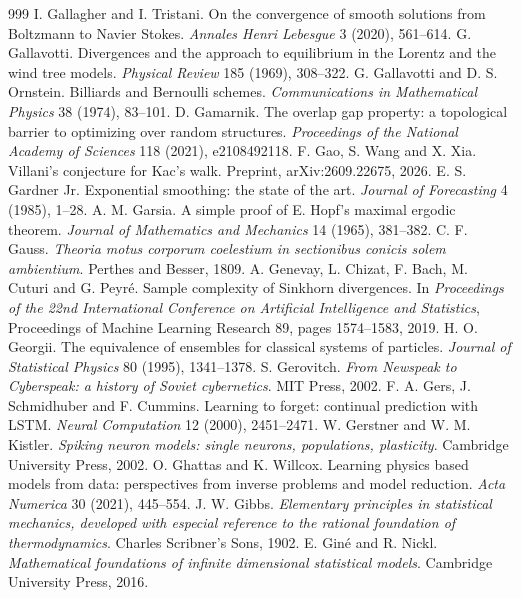 \begin{thebibliography}{999}
 I. Gallagher and I. Tristani. On the convergence of smooth solutions from Boltzmann to Navier Stokes. \emph{Annales Henri Lebesgue} 3 (2020), 561--614.
 G. Gallavotti. Divergences and the approach to equilibrium in the Lorentz and the wind tree models. \emph{Physical Review} 185 (1969), 308--322.
 G. Gallavotti and D. S. Ornstein. Billiards and Bernoulli schemes. \emph{Communications in Mathematical Physics} 38 (1974), 83--101.
 D. Gamarnik. The overlap gap property: a topological barrier to optimizing over random structures. \emph{Proceedings of the National Academy of Sciences} 118 (2021), e2108492118.
 F. Gao, S. Wang and X. Xia. Villani's conjecture for Kac's walk. Preprint, arXiv:2609.22675, 2026.
 E. S. Gardner Jr. Exponential smoothing: the state of the art. \emph{Journal of Forecasting} 4 (1985), 1--28.
 A. M. Garsia. A simple proof of E. Hopf's maximal ergodic theorem. \emph{Journal of Mathematics and Mechanics} 14 (1965), 381--382.
 C. F. Gauss. \emph{Theoria motus corporum coelestium in sectionibus conicis solem ambientium}. Perthes and Besser, 1809.
 A. Genevay, L. Chizat, F. Bach, M. Cuturi and G. Peyr\'e. Sample complexity of Sinkhorn divergences. In \emph{Proceedings of the 22nd International Conference on Artificial Intelligence and Statistics}, Proceedings of Machine Learning Research 89, pages 1574--1583, 2019.
 H. O. Georgii. The equivalence of ensembles for classical systems of particles. \emph{Journal of Statistical Physics} 80 (1995), 1341--1378.
 S. Gerovitch. \emph{From Newspeak to Cyberspeak: a history of Soviet cybernetics}. MIT Press, 2002.
 F. A. Gers, J. Schmidhuber and F. Cummins. Learning to forget: continual prediction with LSTM. \emph{Neural Computation} 12 (2000), 2451--2471.
 W. Gerstner and W. M. Kistler. \emph{Spiking neuron models: single neurons, populations, plasticity}. Cambridge University Press, 2002.
 O. Ghattas and K. Willcox. Learning physics based models from data: perspectives from inverse problems and model reduction. \emph{Acta Numerica} 30 (2021), 445--554.
 J. W. Gibbs. \emph{Elementary principles in statistical mechanics, developed with especial reference to the rational foundation of thermodynamics}. Charles Scribner's Sons, 1902.
 E. Gin\'e and R. Nickl. \emph{Mathematical foundations of infinite dimensional statistical models}. Cambridge University Press, 2016.

\end{thebibliography}
